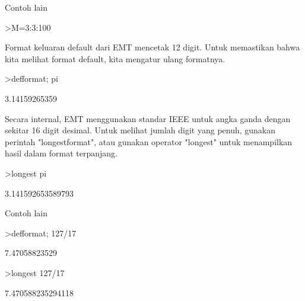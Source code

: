 \documentclass[a4paper,10pt]{article}
\begin{document}
\begin{eulernotebook}
\begin{euleroutput}
  [2,  3,  5,  7,  11,  13,  17,  19,  23,  29,  31,  37,  41,  43,  47,
  53,  59,  61,  67,  71,  73,  79,  83,  89,  97]
\end{euleroutput}
\begin{eulercomment}
Contoh lain
\end{eulercomment}
\begin{eulerprompt}
>M=3:3:100
\end{eulerprompt}
\begin{euleroutput}
  [3,  6,  9,  12,  15,  18,  21,  24,  27,  30,  33,  36,  39,  42,  45,
  48,  51,  54,  57,  60,  63,  66,  69,  72,  75,  78,  81,  84,  87,
  90,  93,  96,  99]
\end{euleroutput}
\begin{eulercomment}
Format keluaran default dari EMT mencetak 12 digit. Untuk memastikan
bahwa kita melihat format default, kita mengatur ulang formatnya.
\end{eulercomment}
\begin{eulerprompt}
>defformat; pi
\end{eulerprompt}
\begin{euleroutput}
  3.14159265359
\end{euleroutput}
\begin{eulercomment}
Secara internal, EMT menggunakan standar IEEE untuk angka ganda dengan
sekitar 16 digit desimal. Untuk melihat jumlah digit yang penuh,
gunakan perintah "longestformat", atau gunakan operator "longest"
untuk menampilkan hasil dalam format terpanjang.
\end{eulercomment}
\begin{eulerprompt}
>longest pi
\end{eulerprompt}
\begin{euleroutput}
        3.141592653589793 
\end{euleroutput}
\begin{eulercomment}
Contoh lain
\end{eulercomment}
\begin{eulerprompt}
>defformat; 127/17
\end{eulerprompt}
\begin{euleroutput}
  7.47058823529
\end{euleroutput}
\begin{eulerprompt}
>longest 127/17
\end{eulerprompt}
\begin{euleroutput}
        7.470588235294118 

\end{euleroutput}
\end{eulernotebook}
\end{document}
